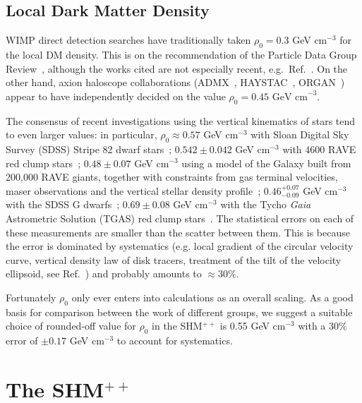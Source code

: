 \documentclass[prd,10pt,twocolumn,showpacs,nofootinbib, aps,superscriptaddress,preprintnumbers]{revtex4-1}
\newcommand{\GeVcm}{\textrm{ GeV cm}^{-3}}
\begin{document}
\subsection{Local Dark Matter Density}\label{sec:rho0}

WIMP direct detection searches have traditionally taken $\rho_0=0.3$ GeV cm$^{-3}$
for the local DM density.
This is on the recommendation of the Particle Data Group Review~\citep{Am08},
although the works cited are not especially recent,
e.g.\ Ref.~\cite{Ga95}. On the other hand, axion haloscope
collaborations (ADMX~\cite{Duffy:2006aa,Asztalos:2009yp,Du:2018uak},
HAYSTAC~\cite{Brubaker:2018ebj,Brubaker:2017rna,Zhong:2017fot},
ORGAN~\cite{McAllister:2017lkb,McAllister:2017ern}) appear to have
independently decided on the value $\rho_0 = 0.45 \GeVcm$.

The consensus of recent investigations using the vertical kinematics
of stars tend to even larger values: in particular, $\rho_0 \approx
0.57$ GeV cm$^{-3}$ with Sloan Digital Sky Survey (SDSS) Stripe 82
dwarf stars~\cite{Smith:2012}; $0.542\pm0.042$ GeV cm$^{-3}$ with
4600 RAVE red clump
stars~\cite{Bienayme:2014}; $0.48 \pm 0.07$ GeV cm$^{-3}$ using a
model of the Galaxy built from 200,000 RAVE giants, together with
constraints from gas terminal velocities, maser observations and the
vertical stellar density profile~\citep{Pi14}; $0.46^{+0.07}_{-0.09}$
GeV cm$^{-3}$ with the SDSS G dwarfs~\cite{Sivertsson:2017rkp};
$0.69\pm0.08$ GeV cm$^{-3}$ with the Tycho \emph{Gaia} Astrometric
Solution (TGAS) red clump stars~\cite{Ha18}.  The statistical errors
on each of these measurements are smaller than the scatter between
them. This is because the error is dominated by systematics
(e.g. local gradient of the circular velocity curve, vertical density
law of disk tracers, treatment of the tilt of the velocity ellipsoid, see Ref.~\cite{Read:2014qva})
and probably amounts to $\approx 30\%$.

Fortunately $\rho_0$ only ever enters into calculations as an overall
scaling.  As a good basis for comparison between the work of different
groups, we suggest a suitable choice of rounded-off value for $\rho_0$
in the SHM$^{++}$ is 0.55 GeV cm$^{-3}$ with a $30 \%$ error of $\pm
0.17$ GeV cm$^{-3}$ to account for systematics.

\section{The SHM$^{++}$}
\label{sec:SHMpp}
\end{document}
